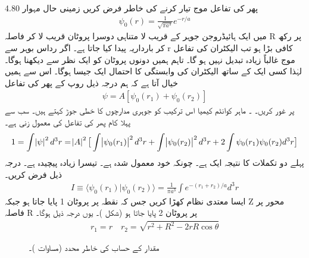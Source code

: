  پھر کی تفاعل موج تیار کرنے کی خاطر فرض کریں زمینی حال مہوار 4.80
\begin{align}
\psi_{0}(r)=\frac{1}{\sqrt{\pi a^{3}}}e^{-r/a} 
\end{align}
  میں ایک ہائیڈروجن جوہر کے قریب لا متناہی دوسرا پروٹان قریب لا کر فاصلہ R پر رکھ کر بارداریہ پیدا کیا جاتا ہے۔ اگر رداس بوہر سے r کافی بڑا ہو تب الیکٹران کی تفاعل موج غالباً زیادہ تبدیل نہیں ہو گا۔ تاہم ہمیں دونوں پروٹان کو ایک نظر سے دیکھنا ہوگا۔ لہٰذا کسی ایک کے ساتھ الیکٹران کی وابستگی کا احتمال ایک  جیسا ہوگا۔ اس سے ہمیں خیال آتا ہے کہ ہم درجہ ذیل روپ کے پھر کی تفاعل 
 \begin{align}
\psi=A[\psi_{0}(r_{1})+\psi_{0}(r_{2})]
\end{align}
  پر غور کریں۔
۔ ماہر کوانٹم کیمیا اس ترکیب کو جوہری مدارچوں کا خطی جوڑ کہتے ہیں۔ 
سب سے پہلا کام پھر کی تفاعل کی معمول زنی ہے۔
 \begin{align}
1=\int\abs{\psi}^{2}d^{3}r=\abs{A}^{2}\big [\int \abs{\psi_{0}(r_{1})}^{2}d^{3}r+\int \abs{\psi_{0}(r_{2})}^{2}d^{3}r+2\int\psi_{0}(r_{1})\psi_{0}(r_{2})d^{3}r\big ]
\end{align}
 پہلے دو تکملات کا نتیجہ ایک ہے۔ چونکہ   خود معمول شدہ ہے۔ تیسرا زیادہ پیچیدہ ہے۔ درجہ ذیل فرض کریں۔
 \begin{align}
I\equiv\langle \psi_{0}(r_{1})|\psi_{0}(r_{2})\rangle=\frac{1}{\pi a^{3}}\int e^{-(r_{1}+r_{2})/a}d^{3}r
\end{align}
 ایسا معتدی نظام کھڑا کریں جس کہ نقطہ پر پروٹان 1 پایا جاتا ہو جبکہ Z محور پر فاصلہ R پر پروٹان 2 پایا جاتا ہو (شکل )۔ یوں درجہ ذیل ہوگا۔ 
\begin{align}
r_{1}=r \quad r_{2}=\sqrt{r^{2}+R^{2}-2rR\cos{\theta}} 
\end{align}
\begin{figure} \centering
{} 
\caption{مقدار  کے حساب کی خاطر محدد (مساوات )۔} 
\label{شکل_تغیریت_محدد_قدار_آئے} 
\end{figure} 
